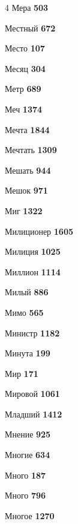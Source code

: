 \begin{multicols}{4}
\noindent Мера \dotfill \textbf{\color{secondary} 503}\par
\noindent Местный \dotfill \textbf{\color{secondary} 672}\par
\noindent Место \dotfill \textbf{\color{secondary} 107}\par
\noindent Месяц \dotfill \textbf{\color{secondary} 304}\par
\noindent Метр \dotfill \textbf{\color{secondary} 689}\par
\noindent Меч \dotfill \textbf{\color{secondary} 1374}\par
\noindent Мечта \dotfill \textbf{\color{secondary} 1844}\par
\noindent Мечтать \dotfill \textbf{\color{secondary} 1309}\par
\noindent Мешать \dotfill \textbf{\color{secondary} 944}\par
\noindent Мешок \dotfill \textbf{\color{secondary} 971}\par
\noindent Миг \dotfill \textbf{\color{secondary} 1322}\par
\noindent Милиционер \dotfill \textbf{\color{secondary} 1605}\par
\noindent Милиция \dotfill \textbf{\color{secondary} 1025}\par
\noindent Миллион \dotfill \textbf{\color{secondary} 1114}\par
\noindent Милый \dotfill \textbf{\color{secondary} 886}\par
\noindent Мимо \dotfill \textbf{\color{secondary} 565}\par
\noindent Министр \dotfill \textbf{\color{secondary} 1182}\par
\noindent Минута \dotfill \textbf{\color{secondary} 199}\par
\noindent Мир \dotfill \textbf{\color{secondary} 171}\par
\noindent Мировой \dotfill \textbf{\color{secondary} 1061}\par
\noindent Младший \dotfill \textbf{\color{secondary} 1412}\par
\noindent Мнение \dotfill \textbf{\color{secondary} 925}\par
\noindent Многие \dotfill \textbf{\color{secondary} 634}\par
\noindent Много \dotfill \textbf{\color{secondary} 187}\par
\noindent Много \dotfill \textbf{\color{secondary} 796}\par
\noindent Многое \dotfill \textbf{\color{secondary} 1270}\par

\end{multicols}
